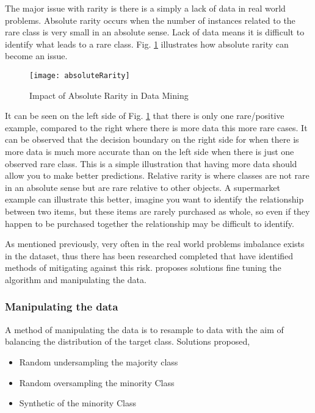 The major issue with rarity is there is a simply a lack of data in real world problems. Absolute rarity occurs when the number of instances related to the rare class is very small in an absolute sense. Lack of data means it is difficult to identify what leads to a rare class. Fig. \ref{fig:absoluteRarity} illustrates how absolute rarity can become an issue.

\begin{figure}[H]
	\texttt{[image: absoluteRarity]}
	\caption{
		Impact of Absolute Rarity in Data Mining \\ \cite[Source:][]{weiss_mining_2004}
	}
	\label{fig:absoluteRarity}
\end{figure}

It can be seen on the left side of Fig. \ref{fig:absoluteRarity} that there is only one rare/positive example, compared to the right where there is more data this more rare cases. It can be observed that the decision boundary on the right side for when there is more data is much more accurate than on the left side when there is just one observed rare class. This is a simple illustration that having more data should allow you to make better predictions. Relative rarity is where classes are not rare in an absolute sense but are rare relative to other objects. A supermarket example can illustrate this better, imagine you want to identify the relationship between two items, but these items are rarely purchased as whole, so even if they happen to be purchased together the relationship may be difficult to identify.

As mentioned previously, very often in the real world problems imbalance exists in the dataset, thus there has been researched completed that have identified methods of mitigating against this risk. \citep{chawla_editorial:_2004} proposes solutions fine tuning the algorithm and manipulating the data. 

\subsubsection{Manipulating the data}

A method of manipulating the data is to resample to data with the aim of balancing the distribution of the target class. Solutions proposed,

\begin{itemize}
	\item Random undersampling the majority class
	\item Random oversampling the minority Class
	\item Synthetic of the minority Class 
\end{itemize}


